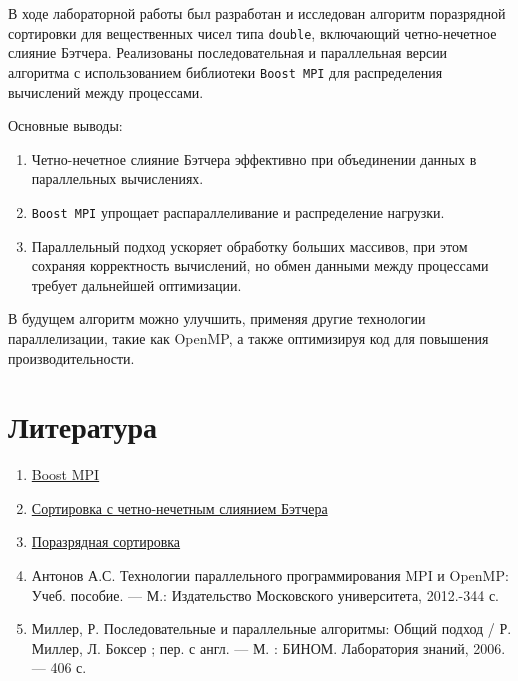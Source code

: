\documentclass[a4paper,12pt]{article}
\begin{document}
В ходе лабораторной работы был разработан и исследован алгоритм поразрядной сортировки для вещественных чисел типа \texttt{double}, включающий четно-нечетное слияние Бэтчера. Реализованы последовательная и параллельная версии алгоритма с использованием библиотеки \texttt{Boost MPI} для распределения вычислений между процессами.

Основные выводы: \begin{enumerate} \item Четно-нечетное слияние Бэтчера эффективно при объединении данных в параллельных вычислениях. \item \texttt{Boost MPI} упрощает распараллеливание и распределение нагрузки. \item Параллельный подход ускоряет обработку больших массивов, при этом сохраняя корректность вычислений, но обмен данными между процессами требует дальнейшей оптимизации. \end{enumerate}

В будущем алгоритм можно улучшить, применяя другие технологии параллелизации, такие как OpenMP, а также оптимизируя код для повышения производительности.

\newpage
\section*{\centering Литература}
\begin{enumerate}
    \item \href{https://www.boost.org/}{Boost MPI}
    \item \href{https://www.youtube.com/watch?v=BwHIu38PCCo}{Сортировка с четно-нечетным слиянием Бэтчера}
    \item \href{https://ru.wikipedia.org/wiki/%D0%9F%D0%BE%D1%80%D0%B0%D0%B7%D1%80%D1%8F%D0%B4%D0%BD%D0%B0%D1%8F_%D1%81%D0%BE%D1%80%D1%82%D0%B8%D1%80%D0%BE%D0%B2%D0%BA%D0%B0}{Поразрядная сортировка}
    \item Антонов А.С. Технологии параллельного программирования MPI и OpenMP: Учеб. пособие. — М.: Издательство Московского университета, 2012.-344 с.
    \item Миллер, Р. Последовательные и параллельные алгоритмы: Общий подход / Р. Миллер, Л. Боксер ; пер. с англ. — М. : БИНОМ. Лаборатория знаний, 2006. — 406 с.
\end{enumerate}

\newpage
\end{document}
